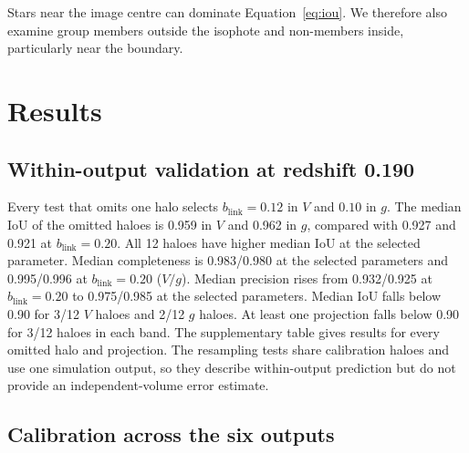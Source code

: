 \documentclass[usenatbib]{mnras}
\begin{document}
\label{sec:noticl}

Stars near the image centre can dominate Equation~\eqref{eq:iou}.
We therefore also examine group members outside the isophote and
non-members inside, particularly near the boundary.

\section{Results}
\label{sec:results}

\subsection{Within-output validation at redshift 0.190}
\label{sec:withinoutput}

Every test that omits one halo selects $b_{\mathrm{link}}=0.12$ in $V$
and $0.10$ in $g$. The median IoU of the omitted haloes is 0.959 in $V$
and 0.962 in $g$, compared with 0.927 and 0.921 at $b_{\mathrm{link}}=0.20$.
All 12 haloes have higher median IoU at the selected parameter. Median
completeness is 0.983/0.980 at the selected parameters and 0.995/0.996
at $b_{\mathrm{link}}=0.20$ ($V/g$). Median precision rises from
0.932/0.925 at $b_{\mathrm{link}}=0.20$ to 0.975/0.985 at the selected
parameters. Median IoU falls below 0.90 for 3/12 $V$ haloes and 2/12 $g$
haloes. At least one projection falls below 0.90 for 3/12 haloes in each
band. The supplementary table gives results for every omitted halo and
projection. The resampling tests share calibration haloes and use one simulation
output, so they describe within-output prediction but do not provide an
independent-volume error estimate.

\subsection{Calibration across the six outputs}
\label{sec:bz}
\end{document}
